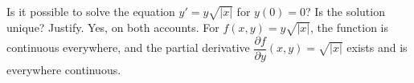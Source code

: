 {Is it possible to solve the equation $y' = y\sqrt{\lvert x\rvert}$ for
$y(0) = 0$?  Is the solution unique?
Justify.}
{Yes, on both accounts. For $f(x,y)=y\sqrt{\lvert x\rvert}$, the function is continuous everywhere, and the partial derivative $\dfrac{\partial f}{\partial y}(x,y) = \sqrt{\lvert x\rvert}$ exists and is everywhere continuous.
}